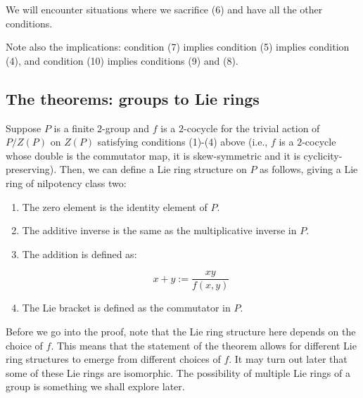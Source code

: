 \documentclass[10pt]{amsart}
\begin{document}
We will encounter situations where we sacrifice (6) and have all the
other conditions.

Note also the implications: condition (7) implies condition (5)
implies condition (4), and condition (10) implies conditions (9) and
(8).

\subsection{The theorems: groups to Lie rings}

\begin{theorem}\label{lazardgrouptoring1234}
  Suppose $P$ is a finite $2$-group and $f$ is a $2$-cocycle for the
  trivial action of $P/Z(P)$ on $Z(P)$ satisfying conditions (1)-(4)
  above (i.e., $f$ is a $2$-cocycle whose double is the commutator
  map, it is skew-symmetric and it is cyclicity-preserving). Then,
  we can define a Lie ring structure on $P$ as follows, giving a Lie
  ring of nilpotency class two:

  \begin{enumerate}
  \item The zero element is the identity element of $P$.
  \item The additive inverse is the same as the multiplicative inverse
    in $P$.
  \item The addition is defined as:

    $$x + y := \frac{xy}{f(x,y)}$$
  \item The Lie bracket is defined as the commutator in $P$.
  \end{enumerate}
\end{theorem}

Before we go into the proof, note that the Lie ring structure here
depends on the choice of $f$. This means that the statement of the
theorem allows for different Lie ring structures to emerge from
different choices of $f$. It may turn out later that some of these Lie
rings are isomorphic. The possibility of multiple Lie rings of a group
is something we shall explore later.
\end{document}

